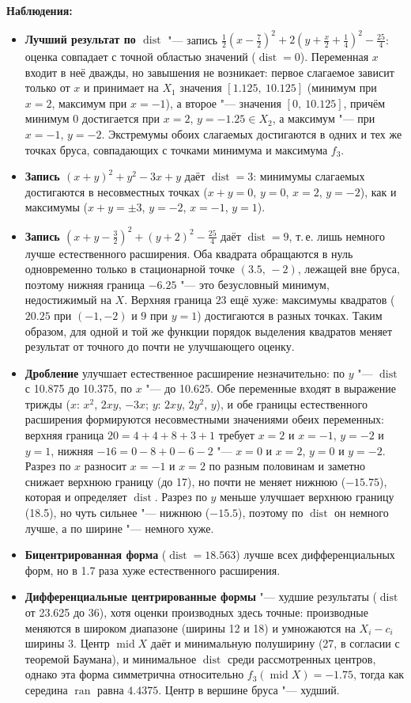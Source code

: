 \documentclass[12pt,a4paper]{article}
\newcommand{\ran}{\operatorname{ran}}
\newcommand{\Mid}{\operatorname{mid}}
\newcommand{\dist}{\operatorname{dist}}
\begin{document}
\textbf{Наблюдения:}
\begin{itemize}
\item \textbf{Лучший результат по $\dist$} "--- запись $\frac12(x-\frac72)^2+2(y+\frac x2+\frac14)^2-\frac{25}4$: оценка совпадает с точной областью значений ($\dist=0$). Переменная $x$ входит в неё дважды, но завышения не возникает: первое слагаемое зависит только от $x$ и принимает на $X_1$ значения $[1.125,\ 10.125]$ (минимум при $x=2$, максимум при $x=-1$), а второе "--- значения $[0,\ 10.125]$, причём минимум $0$ достигается при $x=2$, $y=-1.25\in X_2$, а максимум "--- при $x=-1$, $y=-2$. Экстремумы обоих слагаемых достигаются в одних и тех же точках бруса, совпадающих с точками минимума и максимума $f_3$.
\item \textbf{Запись $(x+y)^2+y^2-3x+y$} даёт $\dist=3$: минимумы слагаемых достигаются в несовместных точках ($x+y=0$, $y=0$, $x=2$, $y=-2$), как и максимумы ($x+y=\pm3$, $y=-2$, $x=-1$, $y=1$).
\item \textbf{Запись $(x+y-\frac32)^2+(y+2)^2-\frac{25}4$} даёт $\dist=9$, т.\,е. лишь немного лучше естественного расширения. Оба квадрата обращаются в нуль одновременно только в стационарной точке $(3.5,\,-2)$, лежащей вне бруса, поэтому нижняя граница $-6.25$ "--- это безусловный минимум, недостижимый на $X$. Верхняя граница $23$ ещё хуже: максимумы квадратов ($20.25$ при $(-1,-2)$ и $9$ при $y=1$) достигаются в разных точках. Таким образом, для одной и той же функции порядок выделения квадратов меняет результат от точного до почти не улучшающего оценку.
\item \textbf{Дробление} улучшает естественное расширение незначительно: по $y$ "--- $\dist$ с 10.875 до 10.375, по $x$ "--- до 10.625. Обе переменные входят в выражение трижды ($x$: $x^2$, $2xy$, $-3x$; $y$: $2xy$, $2y^2$, $y$), и обе границы естественного расширения формируются несовместными значениями обеих переменных: верхняя граница $20=4+4+8+3+1$ требует $x=2$ и $x=-1$, $y=-2$ и $y=1$, нижняя $-16=0-8+0-6-2$ "--- $x=0$ и $x=2$, $y=0$ и $y=-2$. Разрез по $x$ разносит $x=-1$ и $x=2$ по разным половинам и заметно снижает верхнюю границу (до 17), но почти не меняет нижнюю ($-15.75$), которая и определяет $\dist$. Разрез по $y$ меньше улучшает верхнюю границу (18.5), но чуть сильнее "--- нижнюю ($-15.5$), поэтому по $\dist$ он немного лучше, а по ширине "--- немного хуже.
\item \textbf{Бицентрированная форма} ($\dist=18.563$) лучше всех дифференциальных форм, но в 1.7 раза хуже естественного расширения.
\item \textbf{Дифференциальные центрированные формы} "--- худшие результаты ($\dist$ от 23.625 до 36), хотя оценки производных здесь точные: производные меняются в широком диапазоне (ширины 12 и 18) и умножаются на $X_i-c_i$ ширины 3. Центр $\Mid X$ даёт и минимальную полуширину (27, в согласии с теоремой Баумана), и минимальное $\dist$ среди рассмотренных центров, однако эта форма симметрична относительно $f_3(\Mid X)=-1.75$, тогда как середина $\ran$ равна $4.4375$. Центр в вершине бруса "--- худший.

\end{itemize}
\end{document}

